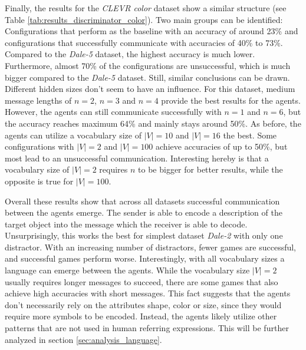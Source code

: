 Finally, the results for the \emph{CLEVR color} dataset show a similar structure (see Table \ref{tab:results_discriminator_color}).
Two main groups can be identified: Configurations that perform as the baseline with an accuracy of around 23\% and configurations that successfully communicate with accuracies of 40\% to 73\%.
Compared to the \emph{Dale-5} dataset, the highest accuracy is much lower.
Furthermore, almost 70\% of the configurations are unsuccessful, which is much bigger compared to the \emph{Dale-5} dataset.
Still, similar conclusions can be drawn.
Different hidden sizes don't seem to have an influence.
For this dataset, medium message lengths of $n=2$, $n=3$ and $n=4$ provide the best results for the agents.
However, the agents can still communicate successfully with $n=1$ and $n=6$, but the accuracy reaches maximum 64\% and mainly stays around 50\%.
As before, the agents can utilize a vocabulary size of $|V|=10$ and $|V|=16$ the best.
Some configurations with $|V|=2$ and $|V|=100$ achieve accuracies of up to 50\%, but most lead to an unsuccessful communication.
Interesting hereby is that a vocabulary size of $|V|=2$ requires $n$ to be bigger for better results, while the opposite is true for $|V|=100$.

Overall these results show that across all datasets successful communication between the agents emerge.
The sender is able to encode a description of the target object into the message which the receiver is able to decode.
Unsurprisingly, this works the best for simplest dataset \emph{Dale-2} with only one distractor.
With an increasing number of distractors, fewer games are successful, and successful games perform worse.
Interestingly, with all vocabulary sizes a language can emerge between the agents.
While the vocabulary size $|V|=2$ usually requires longer messages to succeed, there are some games that also achieve high accuracies with short messages.
This fact suggests that the agents don't necessarily rely on the attributes shape, color or size, since they would require more symbols to be encoded.
Instead, the agents likely utilize other patterns that are not used in human referring expressions.
This will be further analyzed in section \ref{sec:analysis_language}.